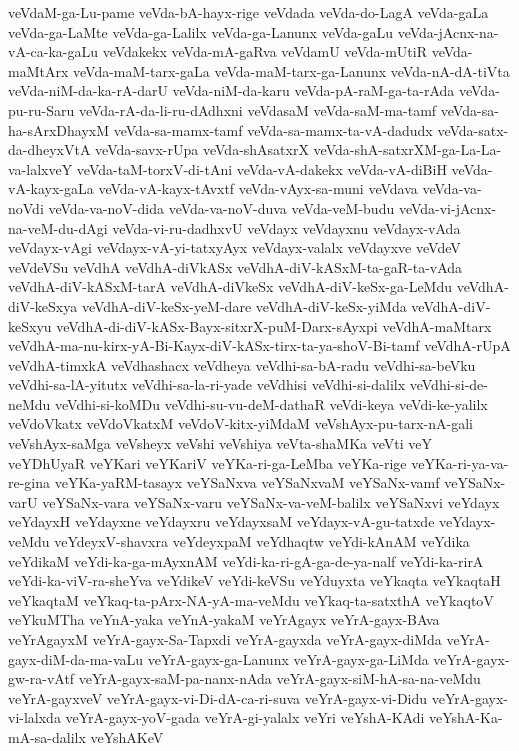 {veVdaM-ga-Lu-pame
veVda-bA-hayx-rige
veVdada
veVda-do-LagA
veVda-gaLa
veVda-ga-LaMte
veVda-ga-Lalilx
veVda-ga-Lanunx
veVda-gaLu
veVda-jAcnx-na-vA-ca-ka-gaLu
veVdakekx
veVda-mA-gaRva
veVdamU
veVda-mUtiR
veVda-maMtArx
veVda-maM-tarx-gaLa
veVda-maM-tarx-ga-Lanunx
veVda-nA-dA-tiVta
veVda-niM-da-ka-rA-darU
veVda-niM-da-karu
veVda-pA-raM-ga-ta-rAda
veVda-pu-ru-Saru
veVda-rA-da-li-ru-dAdhxni
veVdasaM
veVda-saM-ma-tamf
veVda-sa-ha-sArxDhayxM
veVda-sa-mamx-tamf
veVda-sa-mamx-ta-vA-dadudx
veVda-satx-da-dheyxVtA
veVda-savx-rUpa
veVda-shAsatxrX
veVda-shA-satxrXM-ga-La-La-va-lalxveY
veVda-taM-torxV-di-tAni
veVda-vA-dakekx
veVda-vA-diBiH
veVda-vA-kayx-gaLa
veVda-vA-kayx-tAvxtf
veVda-vAyx-sa-muni
veVdava
veVda-va-noVdi
veVda-va-noV-dida
veVda-va-noV-duva
veVda-veM-budu
veVda-vi-jAcnx-na-veM-du-dAgi
veVda-vi-ru-dadhxvU
veVdayx
veVdayxnu
veVdayx-vAda
veVdayx-vAgi
veVdayx-vA-yi-tatxyAyx
veVdayx-valalx
veVdayxve
veVdeV
veVdeVSu
veVdhA
veVdhA-diVkASx
veVdhA-diV-kASxM-ta-gaR-ta-vAda
veVdhA-diV-kASxM-tarA
veVdhA-diVkeSx
veVdhA-diV-keSx-ga-LeMdu
veVdhA-diV-keSxya
veVdhA-diV-keSx-yeM-dare
veVdhA-diV-keSx-yiMda
veVdhA-diV-keSxyu
veVdhA-di-diV-kASx-Bayx-sitxrX-puM-Darx-sAyxpi
veVdhA-maMtarx
veVdhA-ma-nu-kirx-yA-Bi-Kayx-diV-kASx-tirx-ta-ya-shoV-Bi-tamf
veVdhA-rUpA
veVdhA-timxkA
veVdhashacx
veVdheya
veVdhi-sa-bA-radu
veVdhi-sa-beVku
veVdhi-sa-lA-yitutx
veVdhi-sa-la-ri-yade
veVdhisi
veVdhi-si-dalilx
veVdhi-si-de-neMdu
veVdhi-si-koMDu
veVdhi-su-vu-deM-dathaR
veVdi-keya
veVdi-ke-yalilx
veVdoVkatx
veVdoVkatxM
veVdoV-kitx-yiMdaM
veVshAyx-pu-tarx-nA-gali
veVshAyx-saMga
veVsheyx
veVshi
veVshiya
veVta-shaMKa
veVti
veY
veYDhUyaR
veYKari
veYKariV
veYKa-ri-ga-LeMba
veYKa-rige
veYKa-ri-ya-va-re-gina
veYKa-yaRM-tasayx
veYSaNxva
veYSaNxvaM
veYSaNx-vamf
veYSaNx-varU
veYSaNx-vara
veYSaNx-varu
veYSaNx-va-veM-balilx
veYSaNxvi
veYdayx
veYdayxH
veYdayxne
veYdayxru
veYdayxsaM
veYdayx-vA-gu-tatxde
veYdayx-veMdu
veYdeyxV-shavxra
veYdeyxpaM
veYdhaqtw
veYdi-kAnAM
veYdika
veYdikaM
veYdi-ka-ga-mAyxnAM
veYdi-ka-ri-gA-ga-de-ya-nalf
veYdi-ka-rirA
veYdi-ka-viV-ra-sheYva
veYdikeV
veYdi-keVSu
veYduyxta
veYkaqta
veYkaqtaH
veYkaqtaM
veYkaq-ta-pArx-NA-yA-ma-veMdu
veYkaq-ta-satxthA
veYkaqtoV
veYkuMTha
veYnA-yaka
veYnA-yakaM
veYrAgayx
veYrA-gayx-BAva
veYrAgayxM
veYrA-gayx-Sa-Tapxdi
veYrA-gayxda
veYrA-gayx-diMda
veYrA-gayx-diM-da-ma-vaLu
veYrA-gayx-ga-Lanunx
veYrA-gayx-ga-LiMda
veYrA-gayx-gw-ra-vAtf
veYrA-gayx-saM-pa-nanx-nAda
veYrA-gayx-siM-hA-sa-na-veMdu
veYrA-gayxveV
veYrA-gayx-vi-Di-dA-ca-ri-suva
veYrA-gayx-vi-Didu
veYrA-gayx-vi-lalxda
veYrA-gayx-yoV-gada
veYrA-gi-yalalx
veYri
veYshA-KAdi
veYshA-Ka-mA-sa-dalilx
veYshAKeV
}
